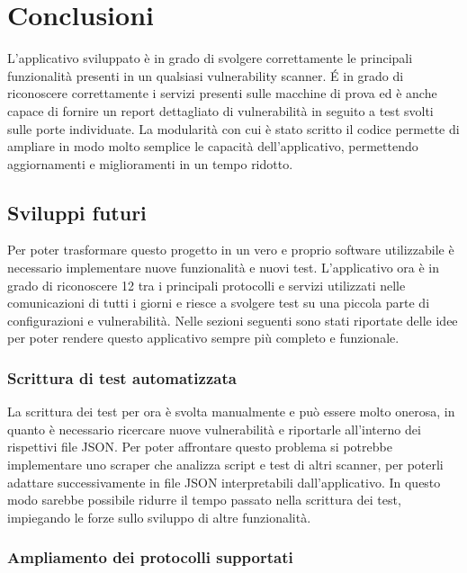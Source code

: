 \documentclass[12pt]{report}
\begin{document}
% 
% 

\chapter{Conclusioni}
\label{cap:conclusioni}

L'applicativo sviluppato è in grado di svolgere correttamente le principali funzionalità presenti in un qualsiasi vulnerability scanner. \'{E} in grado di riconoscere correttamente i servizi presenti sulle macchine di prova ed è anche capace di fornire un report dettagliato di vulnerabilità in seguito a test svolti sulle porte individuate. La modularità con cui è stato scritto il codice permette di ampliare in modo molto semplice le capacità dell'applicativo, permettendo aggiornamenti e miglioramenti in un tempo ridotto.

\section{Sviluppi futuri}

Per poter trasformare questo progetto in un vero e proprio software utilizzabile è necessario implementare nuove funzionalità e nuovi test. L'applicativo ora è in grado di riconoscere 12 tra i principali protocolli e servizi utilizzati nelle comunicazioni di tutti i giorni e riesce a svolgere test su una piccola parte di configurazioni e vulnerabilità. Nelle sezioni seguenti sono stati riportate delle idee per poter rendere questo applicativo sempre più completo e funzionale.

\subsection{Scrittura di test automatizzata}

La scrittura dei test per ora è svolta manualmente e può essere molto onerosa, in quanto è necessario ricercare nuove vulnerabilità e riportarle all'interno dei rispettivi file JSON. Per poter affrontare questo problema si potrebbe implementare uno scraper che analizza script e test di altri scanner, per poterli adattare successivamente in file JSON interpretabili dall'applicativo. In questo modo sarebbe possibile ridurre il tempo passato nella scrittura dei test, impiegando le forze sullo sviluppo di altre funzionalità.

\subsection{Ampliamento dei protocolli supportati}
\end{document}
